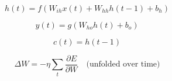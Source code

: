 
\begin{equation}
h(t) = f\left( W_{ih} x(t) + W_{hh} h(t-1) + b_h \right)
\end{equation}

\begin{equation}
y(t) = g\left( W_{ho} h(t) + b_o \right)
\end{equation}

\begin{equation}
c(t) = h(t-1)
\end{equation}

\begin{equation}
\Delta W = -\eta \sum_{t} \frac{\partial E}{\partial W} \quad \text{(unfolded over time)}
\end{equation}